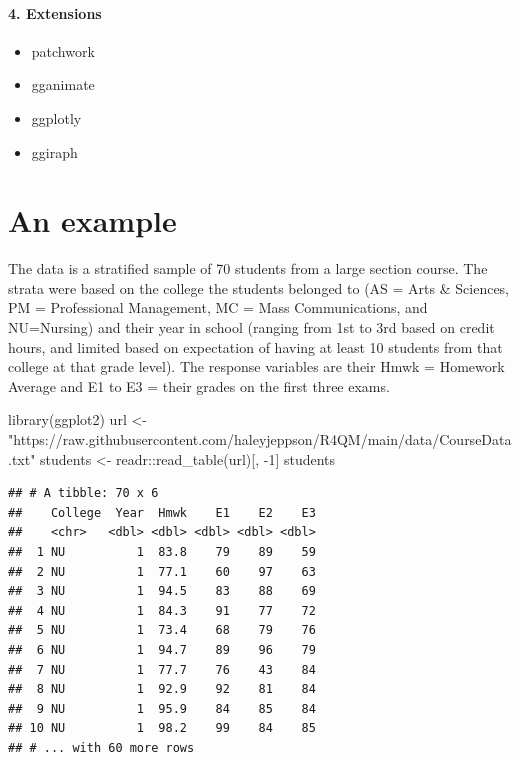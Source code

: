 \documentclass[
]{book}
\newenvironment{Shaded}{\begin{snugshade}}{\end{snugshade}}
\newcommand{\DecValTok}[1]{\textcolor[rgb]{0.00,0.00,0.81}{#1}}
\newcommand{\FunctionTok}[1]{\textcolor[rgb]{0.00,0.00,0.00}{#1}}
\newcommand{\NormalTok}[1]{#1}
\newcommand{\OtherTok}[1]{\textcolor[rgb]{0.56,0.35,0.01}{#1}}
\newcommand{\SpecialCharTok}[1]{\textcolor[rgb]{0.00,0.00,0.00}{#1}}
\newcommand{\StringTok}[1]{\textcolor[rgb]{0.31,0.60,0.02}{#1}}
\providecommand{\tightlist}{%
  \setlength{\itemsep}{0pt}\setlength{\parskip}{0pt}}
\begin{document}
\hypertarget{extensions}{%
\paragraph*{4. Extensions}\label{extensions}}

\begin{itemize}
\tightlist
\item
  patchwork
\item
  gganimate
\item
  ggplotly
\item
  ggiraph
\end{itemize}

\hypertarget{an-example}{%
\section{An example}\label{an-example}}

The data is a stratified sample of 70 students from a large section course. The strata were based on the college the students belonged to (AS = Arts \& Sciences, PM = Professional Management, MC = Mass Communications, and NU=Nursing) and their year in school (ranging from 1st to 3rd based on credit hours, and limited based on expectation of having at least 10 students from that college at that grade level). The response variables are their Hmwk = Homework Average and E1 to E3 = their grades on the first three exams.

\begin{Shaded}
\begin{Highlighting}[]
\FunctionTok{library}\NormalTok{(ggplot2)}
\NormalTok{url }\OtherTok{\textless{}{-}} \StringTok{"https://raw.githubusercontent.com/haleyjeppson/R4QM/main/data/CourseData.txt"}
\NormalTok{students }\OtherTok{\textless{}{-}}\NormalTok{ readr}\SpecialCharTok{::}\FunctionTok{read\_table}\NormalTok{(url)[, }\SpecialCharTok{{-}}\DecValTok{1}\NormalTok{]}
\NormalTok{students}
\end{Highlighting}
\end{Shaded}

\begin{verbatim}
## # A tibble: 70 x 6
##    College  Year  Hmwk    E1    E2    E3
##    <chr>   <dbl> <dbl> <dbl> <dbl> <dbl>
##  1 NU          1  83.8    79    89    59
##  2 NU          1  77.1    60    97    63
##  3 NU          1  94.5    83    88    69
##  4 NU          1  84.3    91    77    72
##  5 NU          1  73.4    68    79    76
##  6 NU          1  94.7    89    96    79
##  7 NU          1  77.7    76    43    84
##  8 NU          1  92.9    92    81    84
##  9 NU          1  95.9    84    85    84
## 10 NU          1  98.2    99    84    85
## # ... with 60 more rows
\end{verbatim}
\end{document}
